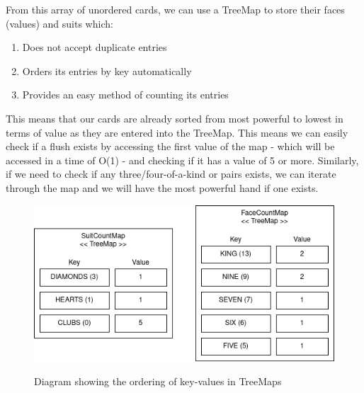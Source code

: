 \documentclass[11pt]{article}
\begin{document}
\vspace{8pt}
From this array of unordered cards, we can use a TreeMap to store their faces (values) and suits which: 
\begin{enumerate}
	\item Does not accept duplicate entries
	\item Orders its entries by key automatically
	\item Provides an easy method of counting its entries
\end{enumerate}

\vspace{8pt}

This means that our cards are already sorted from most powerful to lowest in terms of value as they are entered into the TreeMap. This means we can easily check if a flush exists by accessing the first value of the map - which will be accessed in a time of O(1) - and checking if it has a value of 5 or more. Similarly, if we need to check if any three/four-of-a-kind or pairs exists, we can iterate through the map and we will have the most powerful hand if one exists. 

\begin{figure}[h]
\begin{center}
\includegraphics[scale=0.6]{treemaps} \\
\caption{Diagram showing the ordering of key-values in TreeMaps}
\end{center}

\end{figure}
\end{document}
